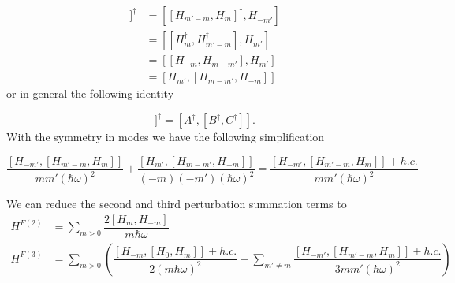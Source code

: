 \begin{align}
  [H_{-m'},[H_{m'-m},H_m]]^{\dagger} &= [[H_{m'-m},H_m]^{\dagger}, H_{-m'}^{\dagger}] \nonumber \\
  &= [ [H_m^{\dagger}, H_{m'-m}^{\dagger}], H_{m'}] \nonumber \\
  &= [ [H_{-m}, H_{m-m'}], H_{m'}] \nonumber \\
  &= [H_{m'}, [H_{m-m'}, H_{-m}]]
\end{align}
or in general the following identity

\begin{equation}
  [A,[B,C]]^{\dagger} = [A^{\dagger}, [B^{\dagger}, C^{\dagger}]].
\end{equation}
With the symmetry in modes we have the following simplification

\begin{equation}
  \dfrac{[H_{-m'},[H_{m'-m},H_m]]}{mm'(\hbar\omega)^2} + \dfrac{[H_{m'},[H_{m-m'},H_{-m}]]}{(-m)(-m')(\hbar\omega)^2} = \dfrac{[H_{-m'},[H_{m'-m},H_m]] + h.c.}{mm'(\hbar\omega)^2}
\end{equation}

We can reduce the second and third perturbation summation terms to
\begin{align}
  H^{F(2)} &= \sum_{m> 0} \dfrac{2[H_m, H_{-m}]}{m\hbar\omega} \\
  H^{F(3)} &= \sum_{m> 0} \left( \dfrac{[H_{-m} , [H_0, H_m]] + h.c.}{2(m\hbar\omega)^2} + \sum_{m'\neq m} \dfrac{[H_{-m'}, [H_{m'-m}, H_m]] + h.c.}{3mm'(\hbar\omega)^2} \right)
\end{align}
